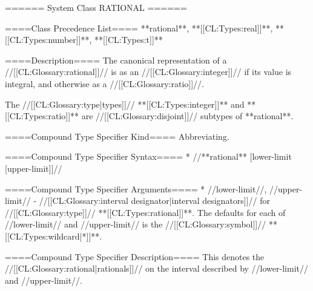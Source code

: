 ====== System Class RATIONAL ======

====Class Precedence List==== 
**rational**, **[[CL:Types:real]]**, **[[CL:Types:number]]**, **[[CL:Types:t]]**

====Description====
The canonical representation of a //[[CL:Glossary:rational]]// is as an //[[CL:Glossary:integer]]// if its value is integral, and otherwise as a //[[CL:Glossary:ratio]]//.

The //[[CL:Glossary:type|types]]// **[[CL:Types:integer]]** and **[[CL:Types:ratio]]** are //[[CL:Glossary:disjoint]]// subtypes of **rational**.

====Compound Type Specifier Kind====
Abbreviating.

====Compound Type Specifier Syntax====
  * //**rational** [lower-limit [upper-limit]]//

====Compound Type Specifier Arguments====
  * //lower-limit//, //upper-limit// - //[[CL:Glossary:interval designator|interval designators]]// for //[[CL:Glossary:type]]// **[[CL:Types:rational]]**. The defaults for each of //lower-limit// and //upper-limit// is the //[[CL:Glossary:symbol]]// **[[CL:Types:wildcard|*]]**.

====Compound Type Specifier Description====
This denotes the //[[CL:Glossary:rational|rationals]]// on the interval described by //lower-limit// and //upper-limit//. 

